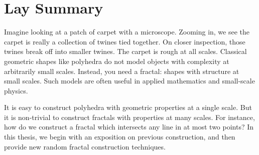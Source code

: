 


\chapter{Lay Summary}

Imagine looking at a patch of carpet with a microscope. Zooming in, we see the carpet is really a collection of twines tied together. On closer inspection, those twines break off into smaller twines. The carpet is rough at all scales. Classical geometric shapes like polyhedra do not model objects with complexity at arbitrarily small scales. Instead, you need a fractal: shapes with structure at small scales. Such models are often useful in applied mathematics and small-scale physics.

It is easy to construct polyhedra with geometric properties at a single scale. But it is non-trivial to construct fractals with properties at many scales. For instance, how do we construct a fractal which intersects any line in at most two points? In this thesis, we begin with an exposition on previous construction, and then provide new random fractal construction techniques.